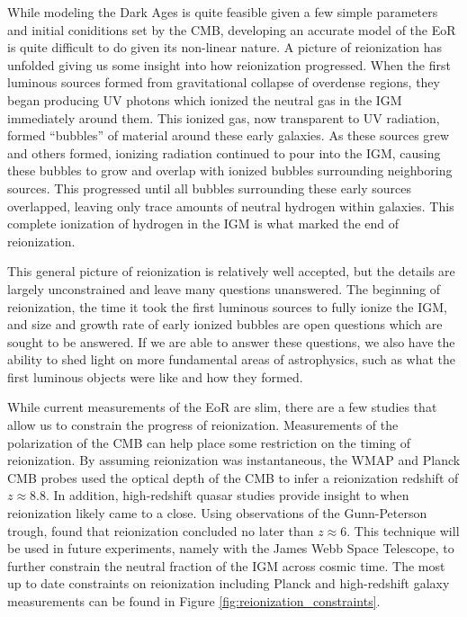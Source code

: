 While modeling the Dark Ages is quite feasible given a few simple parameters and initial
coniditions set by the CMB, developing an accurate model of the EoR is quite difficult
to do given its non-linear nature. A picture of reionization has unfolded
giving us some insight into how reionization progressed. When the first luminous sources formed from gravitational collapse of
overdense regions, they began producing UV photons which ionized the neutral gas in the
IGM immediately around them. This ionized gas, now transparent to UV radiation,
formed ``bubbles'' of material around these early galaxies. As these sources grew and others formed, ionizing radiation
continued to pour into the IGM, causing these bubbles to grow and overlap with ionized
bubbles surrounding neighboring sources. This progressed until all bubbles surrounding these
early sources overlapped, leaving only trace amounts of neutral hydrogen within galaxies.
This complete ionization of hydrogen in the IGM is what marked the end of reionization.

This general picture of reionization is relatively well accepted, but the details
are largely unconstrained and leave many questions unanswered.
The beginning of reionization, the time it took the first luminous sources to fully ionize
the IGM, and size and growth rate of early ionized bubbles are open questions which are
sought to be answered. If we are able to answer these questions, we also have the
ability to shed light on more fundamental areas of astrophysics, such as what the
first luminous objects were like and how they formed.

While current measurements of the EoR are slim, there are a few studies that allow us
to constrain the progress of reionization. Measurements of the polarization
of the CMB can help place some restriction on the timing of reionization. By assuming
reionization was instantaneous, the WMAP and Planck CMB probes used the optical depth of the
CMB to infer a reionization redshift of $z \approx 8.8$. In addition, high-redshift quasar studies provide insight to
when reionization likely came to a close. Using observations of the Gunn-Peterson trough, \cite{2006AJ....132..117F}
found that reionization concluded no later than $z \approx 6$. This technique will
be used in future experiments, namely with the James Webb Space Telescope, to further
constrain the neutral fraction of the IGM across cosmic time. The most up to date constraints on reionization including
Planck and high-redshift galaxy measurements can be found in Figure \ref{fig:reionization_constraints}.

